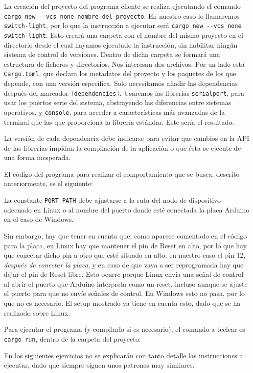 La creación del proyecto del programa cliente se realiza ejecutando el comando
\lstinline{cargo new --vcs none nombre-del-proyecto}. En nuestro caso lo
llamaremos \verb|switch-light|, por lo que la instrucción a ejecutar será
\lstinline{cargo new --vcs none switch-light}. Esto creará una carpeta con el
nombre del mismo proyecto en el directorio desde el cual hayamos ejecutado la
instrucción, sin habilitar ningún sistema de control de versiones. Dentro de
dicha carpeta se formará una estructura de ficheros y directorios. Nos
interesan dos archivos. Por un lado está \verb|Cargo.toml|, que declara los
metadatos del proyecto y los paquetes de los que depende, con una versión
específica. Solo necesitamos añadir las dependencias después del marcador
\lstinline{[dependencies]}. Usaremos las librerías \verb|serialport|, para usar
los puertos serie del sistema, abstrayendo las diferencias entre sistemas
operativos, y \verb|console|, para acceder a características más avanzadas de
la terminal que las que proporciona la librería estándar. Este sería el
resultado:



La versión de cada dependencia debe indicarse para evitar que cambios en la API
de las librerías impidan la compilación de la aplicación o que ésta se ejecute
de una forma inesperada.

El código del programa para realizar el comportamiento que se busca, descrito
anteriormente, es el siguiente:



La constante \verb|PORT_PATH| debe ajustarse a la ruta del nodo de dispositivo
adecuado en Linux o al nombre del puerto donde esté conectada la placa Arduino
en el caso de Windows.

Sin embargo, hay que tener en cuenta que, como aparece comentado en el código
para la placa, en Linux hay que mantener el pin de Reset en alto, por lo que
hay que conectar dicho pin a otro que esté situado en alto, en nuestro caso el
pin 12, \emph{después de conectar la placa}, y en caso de que vaya a ser
reprogramada hay que dejar el pin de Reset libre. Esto ocurre porque Linux
envía una señal de control al abrir el puerto que Arduino interpreta como un
reset, incluso aunque se ajuste el puerto para que no envíe señales de
control\footnotemark. En Windows esto no pasa, por lo que no es necesario. El
setup mostrado ya tiene en cuenta esto, dado que se ha realizado sobre Linux.


Para ejecutar el programa (y compilarlo si es necesario), el comando a teclear
es \lstinline{cargo run}, dentro de la carpeta del proyecto.

En los siguientes ejercicios no se explicarán con tanto detalle las
instrucciones a ejecutar, dado que siempre siguen unos patrones muy similares.